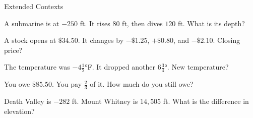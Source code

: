 \begin{practiceBox}{Extended Contexts}
\resetProblems

\prob A submarine is at $-250$ ft. It rises $80$ ft, then dives $120$ ft. What is its depth?

\prob A stock opens at $\$34.50$. It changes by $-\$1.25$, $+\$0.80$, and $-\$2.10$. Closing price?

\prob The temperature was $-4\frac{1}{2}°$F. It dropped another $6\frac{3}{4}°$. New temperature?

\prob You owe $\$85.50$. You pay $\frac{2}{3}$ of it. How much do you still owe?

\prob Death Valley is $-282$ ft. Mount Whitney is $14{,}505$ ft. What is the difference in elevation?

\end{practiceBox}
